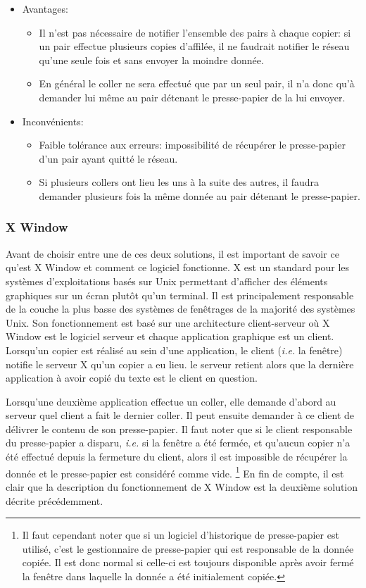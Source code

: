 \begin{itemize}
\item Avantages:
  \begin{itemize}
  \item Il n'est pas nécessaire de notifier l'ensemble des pairs à chaque
    copier: si un pair effectue plusieurs copies d'affilée, il ne faudrait
    notifier le réseau qu'une seule fois et sans envoyer la moindre donnée.
  \item En général le coller ne sera effectué que par un seul pair,
    il n'a donc qu'à demander lui même au pair détenant le presse-papier
    de la lui envoyer.
  \end{itemize}
\item Inconvénients:
  \begin{itemize}
  \item Faible tolérance aux erreurs: impossibilité de récupérer le
    presse-papier d'un pair ayant quitté le réseau.
  \item Si plusieurs collers ont lieu les uns à la suite des autres, il faudra
    demander plusieurs fois la même donnée au pair détenant le presse-papier.\\
  \end{itemize}
\end{itemize}

\subsubsection{X Window}
Avant de choisir entre une de ces deux solutions, il est important de
savoir ce qu'est X Window et comment ce logiciel fonctionne\cite{nye1992xlib}.
X est un standard pour les systèmes d'exploitations basés sur Unix permettant
d'afficher des éléments graphiques sur un écran plutôt qu'un terminal.
Il est principalement responsable de la couche la plus basse des systèmes
de fenêtrages de la majorité des systèmes Unix. Son fonctionnement est basé
sur une architecture client-serveur où X Window est le logiciel serveur
et chaque application graphique est un client. Lorsqu'un copier est réalisé au
sein d'une application, le client (\emph{i.e.} la fenêtre) notifie le serveur X
qu'un copier a eu lieu. le serveur retient alors que la dernière application
à avoir copié du texte est le client en question.

Lorsqu'une deuxième
application effectue un coller, elle demande d'abord au serveur quel client
a fait le dernier coller. Il peut ensuite demander à ce client de délivrer
le contenu de son presse-papier. Il faut noter que si le client responsable
du presse-papier a disparu, \emph{i.e.} si la fenêtre a été fermée, et qu'aucun
copier n'a été effectué depuis la fermeture du client, alors il est
impossible de récupérer la donnée et le presse-papier est considéré comme vide.
\footnote{Il faut cependant noter que si un logiciel d'historique de
presse-papier est utilisé, c'est le gestionnaire de presse-papier qui est
responsable de la donnée copiée. Il est donc normal si celle-ci est toujours
disponible après avoir fermé la fenêtre dans laquelle la donnée a été
initialement copiée.}
En fin de compte, il est clair que la description du fonctionnement de X Window
est la deuxième solution décrite précédemment.


